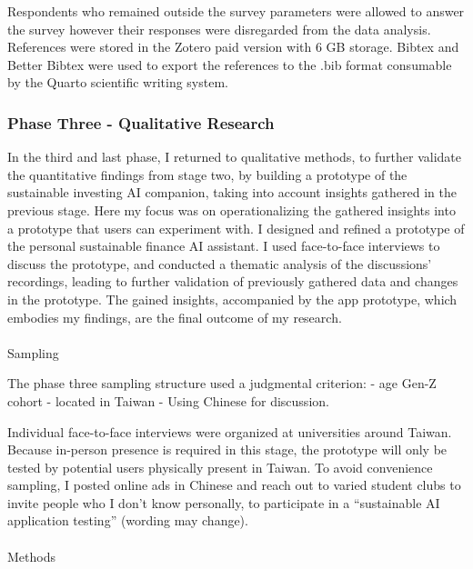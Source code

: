 \documentclass[
  12pt,
  letterpaper,
  DIV=11,
  numbers=noendperiod]{scrartcl}
\makeatletter
\let\oldparagraph\paragraph
\renewcommand{\paragraph}{
    \@ifstar
      \xxxParagraphStar
      \xxxParagraphNoStar
  }
\newcommand{\xxxParagraphStar}[1]{\oldparagraph*{#1}\mbox{}}
\newcommand{\xxxParagraphNoStar}[1]{\oldparagraph{#1}\mbox{}}
\makeatother
\begin{document}
Respondents who remained outside the survey parameters were allowed to
answer the survey however their responses were disregarded from the data
analysis. References were stored in the Zotero paid version with 6 GB
storage. Bibtex and Better Bibtex were used to export the references to
the .bib format consumable by the Quarto scientific writing system.

\subsubsection{Phase Three - Qualitative
Research}\label{phase-three---qualitative-research}

In the third and last phase, I returned to qualitative methods, to
further validate the quantitative findings from stage two, by building a
prototype of the sustainable investing AI companion, taking into account
insights gathered in the previous stage. Here my focus was on
operationalizing the gathered insights into a prototype that users can
experiment with. I designed and refined a prototype of the personal
sustainable finance AI assistant. I used face-to-face interviews to
discuss the prototype, and conducted a thematic analysis of the
discussions' recordings, leading to further validation of previously
gathered data and changes in the prototype. The gained insights,
accompanied by the app prototype, which embodies my findings, are the
final outcome of my research.

\paragraph{Sampling}\label{sampling-2}

The phase three sampling structure used a judgmental criterion: - age
Gen-Z cohort - located in Taiwan - Using Chinese for discussion.

Individual face-to-face interviews were organized at universities around
Taiwan. Because in-person presence is required in this stage, the
prototype will only be tested by potential users physically present in
Taiwan. To avoid convenience sampling, I posted online ads in Chinese
and reach out to varied student clubs to invite people who I don't know
personally, to participate in a ``sustainable AI application testing''
(wording may change).

\paragraph{Methods}\label{methods-2}
\end{document}
